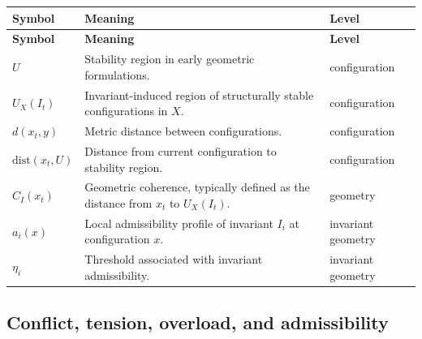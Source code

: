 \documentclass[11pt,a4paper]{article}
\begin{document}
	\begin{longtable}{>{\RaggedRight\arraybackslash}p{}
			>{\RaggedRight\arraybackslash}p{}
			>{\RaggedRight\arraybackslash}p{}}
		\toprule
		\textbf{Symbol} & \textbf{Meaning} & \textbf{Level} \\
		\midrule
		\endfirsthead
		\toprule
		\textbf{Symbol} & \textbf{Meaning} & \textbf{Level} \\
		\midrule
		\endhead
		
		$U$ & Stability region in early geometric formulations. & configuration \\
		
		$U_X(I_t)$ & Invariant-induced region of structurally stable configurations in $X$. & configuration \\
		
		$d(x_t,y)$ & Metric distance between configurations. & configuration \\
		
		$\mathrm{dist}(x_t,U)$ & Distance from current configuration to stability region. & configuration \\
		
		$C_I(x_t)$ & Geometric coherence, typically defined as the distance from $x_t$ to $U_X(I_t)$. & geometry \\
		
		$a_i(x)$ & Local admissibility profile of invariant $I_i$ at configuration $x$. & invariant geometry \\
		
		$\eta_i$ & Threshold associated with invariant admissibility. & invariant geometry \\
		
		\bottomrule
	\end{longtable}
	
	\subsection{Conflict, tension, overload, and admissibility}
	
\end{document}
